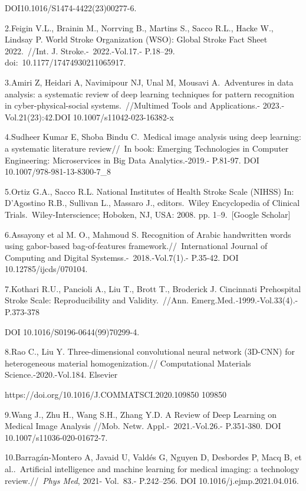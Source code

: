 DOI10.1016/S1474-4422(23)00277-6.~

2.Feigin V.L., Brainin M., Norrving B., Martins S., Sacco R.L., Hacke
W., Lindsay P. World Stroke Organization (WSO): Global Stroke Fact Sheet
2022.~//Int. J. Stroke.-~2022.-Vol.17.- P.18--29.
doi:~10.1177/17474930211065917.~

3.Amiri Z, Heidari A, Navimipour NJ, Unal M, Mousavi A.~Adventures in
data analysis: a systematic review of deep learning techniques for
pattern recognition in cyber-physical-social systems.~//Multimed Tools
and Applications.- 2023.- Vol.21(23):42.DOI 10.1007/s11042-023-16382-x

4.Sudheer Kumar E, Shoba Bindu C.~Medical image analysis using deep
learning: a systematic literature review//~In book: Emerging
Technologies in Computer Engineering: Microservices in Big Data
Analytics.-2019.- P.81-97. DOI 10.1007/978-981-13-8300-7\_8

5.Ortiz G.A., Sacco R.L. National Institutes of Health Stroke Scale
(NIHSS) In: D'Agostino R.B., Sullivan L., Massaro J., editors.~Wiley
Encyclopedia of Clinical Trials.~Wiley-Interscience; Hoboken, NJ, USA:
2008. pp. 1--9.~{[}Google Scholar{]}

6.Assayony et al M. O., Mahmoud S. Recognition of Arabic handwritten
words using gabor-based bag-of-features
framework.//\emph{~}International Journal of Computing and Digital
Systemss.-\emph{~}2018.-Vol.7(1).- P.35-42. DOI 10.12785/ijcds/070104.

7.Kothari R.U., Pancioli A., Liu T., Brott T., Broderick J. Cincinnati
Prehospital Stroke Scale: Reproducibility and Validity.~//Ann.
Emerg.Med.\emph{-}1999.-Vol.33(4).- P.373-378

DOI 10.1016/S0196-0644(99)70299-4.

8.Rao C., Liu Y. Three-dimensional convolutional neural network (3D-CNN)
for heterogeneous material homogenization.// Computational Materials
Science.-2020.-Vol.184. Elsevier

https://doi.org/10.1016/J.COMMATSCI.2020.109850 109850

9.Wang J., Zhu H., Wang S.H., Zhang Y.D. A Review of Deep Learning on
Medical Image Analysis //Mob. Netw. Appl.-\emph{~}2021.-Vol.26.-
P.351-380. DOI 10.1007/s11036-020-01672-7.~

10.Barragán-Montero A, Javaid U, Valdés G, Nguyen D, Desbordes P, Macq
B, et al..~Artificial intelligence and machine learning for medical
imaging: a technology review.//~\emph{Phys Med}, 2021- Vol.~83.-
P.242--256. DOI 10.1016/j.ejmp.2021.04.016.


